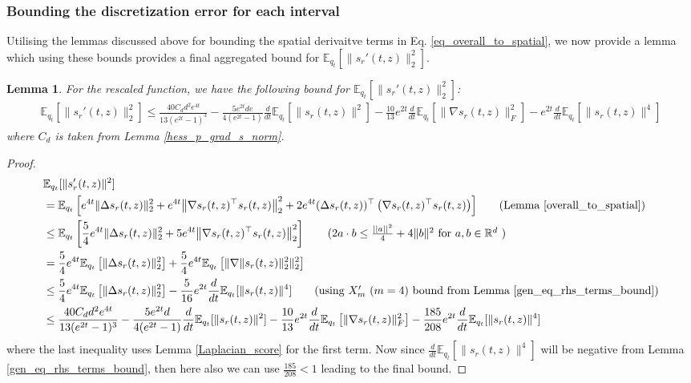 \documentclass{article}
\newtheorem{lemma}{Lemma}[section]
\begin{document}
\subsubsection{Bounding the discretization error for each interval}
\noindent
 Utilising the lemmas discussed above for bounding the spatial derivaitve terms in Eq. \ref{eq_overall_to_spatial}, we now provide a lemma which using these bounds provides a final aggregated bound for $\mathbb{E}_{q_t}[\|s_r'(t,z)\|_2^2]$.
\begin{lemma}
\label{overall_derivative_bound}
    For the rescaled function, we have the following bound for $\mathbb{E}_{q_t}[\|s_r'(t,z)\|_2^2]$:
    \begin{align*}
        \mathbb{E}_{q_t}[\|s_r'(t,z)\|_2^2] \leq { {\frac{40C_d d^2e^{4t}}{13(e^{2t}-1)^{3}}    -  \frac{5e^{2t}de}{4(e^{2t}-1)} \frac{d}{dt}\mathbb{E}_{q_t}[\|s_r(t,z)\|^2]  - \frac{10}{13} e^{2t}\frac{d}{dt}\mathbb{E}_{q_t}\left[\|\nabla s_r(t,z)\|_F^2\right] - e^{2t}\frac{d}{dt}\mathbb{E}_{q_t}[\|s_r(t,z)\|^4]} } 
    \end{align*}
    where $C_d$ is taken from Lemma \ref{hess_p_grad_s_norm}.
\end{lemma}

\begin{proof}
    \begin{align*}
    &\mathbb{E}_{q_t}[\|s_r'(t,z)\|^2] \\
     &= {\mathbb{E}_{q_t}\left[{ e^{4t}\| \Delta s_r(t,z) \|^2_2} + e^{4t}{\left\|\nabla s_r(t,z)^\top s_r(t,z)\right\|_2^2} + 2e^{4t}(\Delta s_r(t,z))^\top\left(\nabla s_r(t,z)^\top s_r(t,z)\right)\right]} \qquad \text{(Lemma \ref{overall_to_spatial})} \\
     &\leq {\mathbb{E}_{q_t}\left[{ \frac{5}{4}e^{4t}\| \Delta s_r(t,z) \|^2_2} + 5e^{4t}{\left\|\nabla s_r(t,z)^\top s_r(t,z)\right\|_2^2}\right]  \tag{$2a\cdot b \leq \frac{||a||^2}{4} + 4\|b\|^2$ for $a,b\in \mathbb{R}^d$ }}\\
     &= { \frac{5}{4}e^{4t}{\mathbb{E}_{q_t}\left[\| \Delta s_r(t,z) \|^2_2\right] + \frac{5}{4}e^{4t}\mathbb{E}_{q_t}\left[{\|\nabla \|s_r(t,z)\|^2_2\|^2_2}\right]} } \\
     &\leq { \frac{5}{4}e^{4t}{\mathbb{E}_{q_t}\left[\| \Delta s_r(t,z) \|^2_2\right] - \frac{5}{16}e^{2t}\frac{d}{dt}\mathbb{E}_{q_t}[\|s_r(t,z)\|^4]} } \tag{using $X'_m$ ($m=4$) bound from Lemma \ref{gen_eq_rhs_terms_bound}}\\
     &\leq { {\frac{40 C_d d^2e^{4t}}{13(e^{2t}-1)^{3}}    -  \frac{5e^{2t}d}{4(e^{2t}-1)} \frac{d}{dt}\mathbb{E}_{q_t}[\|s_r(t,z)\|^2]  - \frac{10}{13} e^{2t}\frac{d}{dt}\mathbb{E}_{q_t}\left[\|\nabla s_r(t,z)\|_F^2\right] - \frac{185}{208}e^{2t}\frac{d}{dt}\mathbb{E}_{q_t}[\|s_r(t,z)\|^4]} } 
\end{align*}
{where the  last inequality uses Lemma \ref{Laplacian_score} for the first term.} Now since $\frac{d}{dt}\mathbb{E}_{q_t}[\|s_r(t,z)\|^4]$ will be negative from Lemma \ref{gen_eq_rhs_terms_bound}, then here also we can use $\frac{185}{208}<1$ leading to the final bound.
\end{proof}
\end{document}
